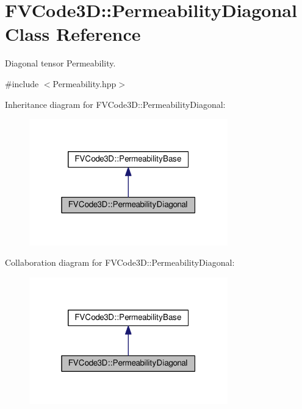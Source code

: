 \hypertarget{classFVCode3D_1_1PermeabilityDiagonal}{}\section{F\+V\+Code3D\+:\+:Permeability\+Diagonal Class Reference}
\label{classFVCode3D_1_1PermeabilityDiagonal}


Diagonal tensor Permeability.  




{\ttfamily \#include $<$Permeability.\+hpp$>$}



Inheritance diagram for F\+V\+Code3D\+:\+:Permeability\+Diagonal\+:
\nopagebreak
\begin{figure}[H]
\begin{center}
\leavevmode
\includegraphics[width=244pt]{classFVCode3D_1_1PermeabilityDiagonal__inherit__graph}
\end{center}
\end{figure}


Collaboration diagram for F\+V\+Code3D\+:\+:Permeability\+Diagonal\+:
\nopagebreak
\begin{figure}[H]
\begin{center}
\leavevmode
\includegraphics[width=244pt]{classFVCode3D_1_1PermeabilityDiagonal__coll__graph}
\end{center}
\end{figure}

